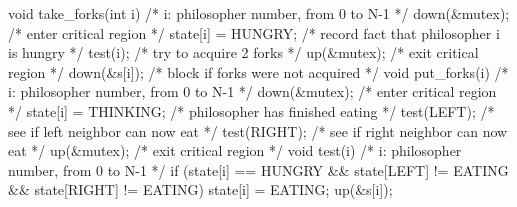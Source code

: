 \documentclass[varwidth=40em,crop]{standalone}
\begin{document}
\begin{ccode}
void take_forks(int i)            /* i: philosopher number, from 0 to N-1 */
{
    down(&mutex);                 /* enter critical region */
    state[i] = HUNGRY;            /* record fact that philosopher i is hungry */
    test(i);                      /* try to acquire 2 forks */
    up(&mutex);                   /* exit critical region */
    down(&s[i]);                  /* block if forks were not acquired */
}
void put_forks(i)                 /* i: philosopher number, from 0 to N-1 */
{
    down(&mutex);                 /* enter critical region */
    state[i] = THINKING;          /* philosopher has finished eating */
    test(LEFT);                   /* see if left neighbor can now eat */
    test(RIGHT);                  /* see if right neighbor can now eat */
    up(&mutex);                   /* exit critical region */
}
void test(i)                      /* i: philosopher number, from 0 to N-1 */
{
    if (state[i] == HUNGRY && state[LEFT] != EATING && state[RIGHT] != EATING) {
          state[i] = EATING;
          up(&s[i]);
    }
}  
\end{ccode}
\end{document}
